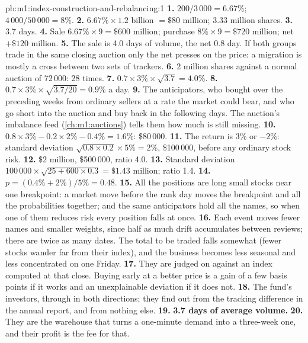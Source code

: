 \begin{solution}{pb:m1:index-construction-and-rebalancing:1}
\textbf{1.} $200/3\,000 = 6.67\%$; $4\,000/50\,000 = 8\%$.
\textbf{2.} $6.67\% \times 1.2$ billion $= \$80$ million; 3.33 million shares.
\textbf{3.} 3.7 days.
\textbf{4.} Sale $6.67\% \times 9 = \$600$ million; purchase $8\% \times 9 =
\$720$ million; net $+\$120$ million.
\textbf{5.} The sale is 4.0 days of volume, the net 0.8 day. If both groups
trade in the same closing auction only the net presses on the price: a
migration is mostly a cross between two sets of trackers.
\textbf{6.} 2 million shares against a normal auction of 72\,000: 28 times.
\textbf{7.} $0.7 \times 3\% \times \sqrt{3.7} = 4.0\%$.
\textbf{8.} $0.7 \times 3\% \times \sqrt{3.7/20} = 0.9\%$ a day.
\textbf{9.} The anticipators, who bought over the preceding weeks from
ordinary sellers at a rate the market could bear, and  who go
short into the auction and buy back in the following days. The auction's
imbalance feed (\cref{ch:m1:auctions}) tells them how much is still missing.
\textbf{10.} $0.8 \times 3\% - 0.2 \times 2\% - 0.4\% = 1.6\%$: \$80\,000.
\textbf{11.} The return is 3\% or $-2\%$: standard deviation $\sqrt{0.8
\times 0.2} \times 5\% = 2\%$, \$100\,000, before any ordinary stock risk.
\textbf{12.} \$2 million, \$500\,000, ratio 4.0.
\textbf{13.} Standard deviation $100\,000 \times \sqrt{25 + 600 \times 0.3} =
\$1.43$ million; ratio 1.4.
\textbf{14.} $p = (0.4\% + 2\%)/5\% = 0.48$.
\textbf{15.} All the positions are long small stocks near one breakpoint: a
market move before the rank day moves the breakpoint and all the
probabilities together; and the same anticipators hold all the names, so
when one of them reduces risk every position falls at once.
\textbf{16.} Each event moves fewer names and smaller weights, since half as
much drift accumulates between reviews; there are twice as many dates. The
total to be traded falls somewhat (fewer stocks wander far from their index),
and the business becomes less seasonal and less concentrated on one Friday.
\textbf{17.} They are judged on  against an index computed at
that close. Buying early at a better price is a gain of a few basis points
if it works and an unexplainable deviation if it does not.
\textbf{18.} The fund's investors, through  in both
directions; they find out from the tracking difference in the annual report,
and from nothing else.
\textbf{19.} \textbf{3.7 days of average volume.}
\textbf{20.} They are the warehouse that turns a one-minute demand into a
three-week one, and their profit is the fee for that.
\end{solution}

